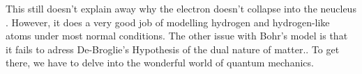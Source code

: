 This still doesn't explain away why the electron doesn't collapse into the neucleus .
However, it does a very good job of modelling hydrogen and hydrogen-like atoms under most normal conditions.
The other issue with Bohr's model is that it fails to adress De-Broglie’s Hypothesis of the dual nature of matter..
To get there, we have to delve into the wonderful world of quantum mechanics.
